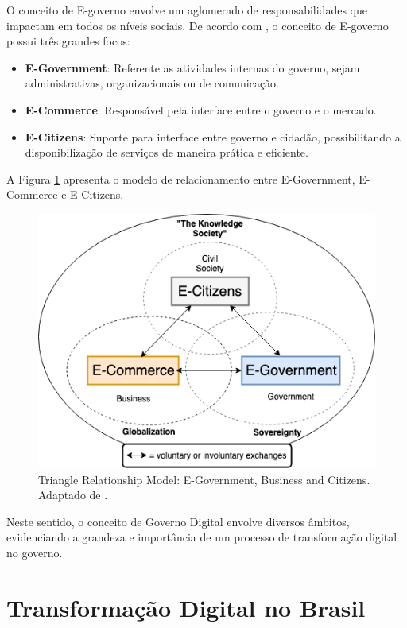 O conceito de E-governo envolve um aglomerado de responsabilidades que impactam em todos os níveis sociais. De acordo com \cite{fang2002government}, o conceito de E-governo possui três grandes focos: 

\begin{itemize}
    \item \textbf{E-Government}: Referente as atividades internas do governo, sejam administrativas, organizacionais ou de comunicação. 
    \item \textbf{E-Commerce}: Responsável pela interface entre o governo e o mercado.
    \item \textbf{E-Citizens}: Suporte para interface entre governo e cidadão, possibilitando a disponibilização de serviços de maneira prática e eficiente.
\end{itemize}

A Figura \ref{img:triangulo} apresenta o modelo de relacionamento entre E-Government, E-Commerce e E-Citizens.

\begin{figure}[!htb]
\centering
\includegraphics[width=.8\textwidth]{figuras/relacao_triangular_e-gov.png}
\caption{Triangle Relationship Model: E-Government, Business and Citizens. Adaptado de \cite{fang2002government}.}
\label{img:triangulo}
\end{figure}

Neste sentido, o conceito de Governo Digital envolve diversos âmbitos, evidenciando a grandeza e importância de um processo de transformação digital no governo.


\section{Transformação Digital no Brasil}

